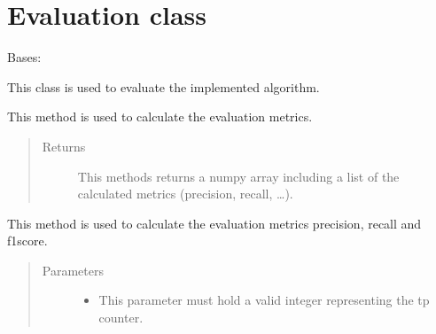 \documentclass[letterpaper,10pt,english,openany,oneside]{sphinxmanual}
\begin{document}
\section{Evaluation class}
\label{\detokenize{Evaluation:evaluation-class}}\label{\detokenize{Evaluation::doc}}

\begin{fulllineitems}
\label{\detokenize{Evaluation:sbd.Evaluation.Evaluation}}
Bases: 

This class is used to evaluate the implemented algorithm.

\begin{fulllineitems}
\label{\detokenize{Evaluation:sbd.Evaluation.Evaluation.calculateEvaluationMetrics}}
This method is used to calculate the evaluation metrics.
\begin{quote}\begin{description}
\item[{Returns}] \leavevmode
This methods returns a numpy array including a list of the calculated metrics (precision, recall, …).

\end{description}\end{quote}

\end{fulllineitems}


\begin{fulllineitems}
\label{\detokenize{Evaluation:sbd.Evaluation.Evaluation.calculateMetrics}}
This method is used to calculate the evaluation metrics precision, recall and f1score.
\begin{quote}\begin{description}
\item[{Parameters}] \leavevmode\begin{itemize}
\item {} 
 \textendash{} This parameter must hold a valid integer representing the tp counter.


\end{itemize}
\end{description}
\end{quote}
\end{fulllineitems}
\end{fulllineitems}
\end{document}
